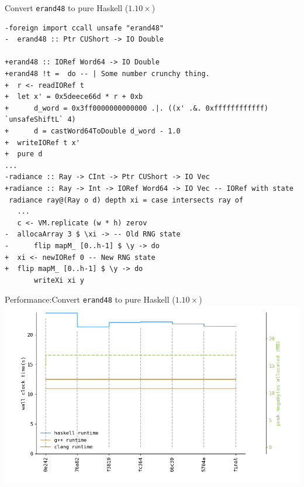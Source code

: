 \documentclass[8pt]{beamer}
\begin{document}
\begin{frame}[fragile]{ Convert \texttt{erand48} to pure Haskell ($1.10\times$)}
\begin{verbatim}
-foreign import ccall unsafe "erand48"
-  erand48 :: Ptr CUShort -> IO Double

+erand48 :: IORef Word64 -> IO Double
+erand48 !t =  do -- | Some number crunchy thing.
+  r <- readIORef t
+  let x' = 0x5deece66d * r + 0xb
+      d_word = 0x3ff0000000000000 .|. ((x' .&. 0xffffffffffff) `unsafeShiftL` 4)
+      d = castWord64ToDouble d_word - 1.0
+  writeIORef t x'
+  pure d
...
-radiance :: Ray -> CInt -> Ptr CUShort -> IO Vec
+radiance :: Ray -> Int -> IORef Word64 -> IO Vec -- IORef with state
 radiance ray@(Ray o d) depth xi = case intersects ray of
   ...
   c <- VM.replicate (w * h) zerov
-  allocaArray 3 $ \xi -> -- Old RNG state
-      flip mapM_ [0..h-1] $ \y -> do
+  xi <- newIORef 0 -- New RNG state
+  flip mapM_ [0..h-1] $ \y -> do
       writeXi xi y
\end{verbatim}

\end{frame}

\begin{frame}[fragile]{Performance:Convert \texttt{erand48} to pure Haskell ($1.10\times$)}
\includegraphics[height=0.6\textwidth]{perfdata-upto-5704a-gen.png}
\end{frame}
\end{document}
